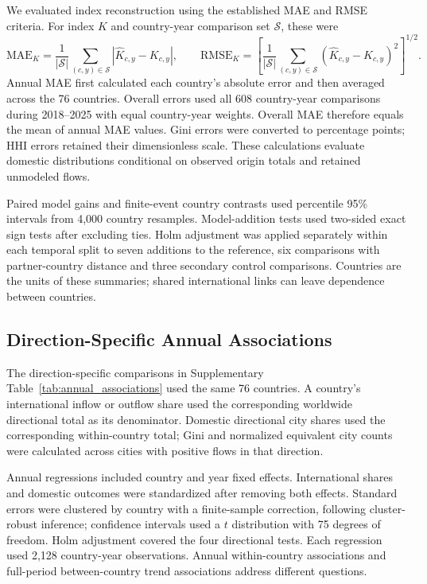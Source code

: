 We evaluated index reconstruction using the established MAE and RMSE criteria\cite{hodson2022}. For index $K$ and country-year comparison set $\mathcal{S}$, these were
\begin{equation*}
\mathrm{MAE}_K=\frac{1}{|\mathcal{S}|}\sum_{(c,y)\in\mathcal{S}}
|\widehat{K}_{c,y}-K_{c,y}|,\qquad
\mathrm{RMSE}_K=\left[\frac{1}{|\mathcal{S}|}\sum_{(c,y)\in\mathcal{S}}
(\widehat{K}_{c,y}-K_{c,y})^2\right]^{1/2}.
\end{equation*}
Annual MAE first calculated each country's absolute error and then averaged across the 76 countries. Overall errors used all 608 country-year comparisons during 2018--2025 with equal country-year weights. Overall MAE therefore equals the mean of annual MAE values. Gini errors were converted to percentage points; HHI errors retained their dimensionless scale. These calculations evaluate domestic distributions conditional on observed origin totals and retained unmodeled flows.

Paired model gains and finite-event country contrasts used percentile 95\% intervals from 4,000 country resamples. Model-addition tests used two-sided exact sign tests after excluding ties. Holm adjustment\cite{holm1979} was applied separately within each temporal split to seven additions to the reference, six comparisons with partner-country distance and three secondary control comparisons. Countries are the units of these summaries; shared international links can leave dependence between countries.

\subsection{Direction-Specific Annual Associations}
\label{supp:annual_associations}

The direction-specific comparisons in Supplementary Table~\ref{tab:annual_associations} used the same 76 countries. A country's international inflow or outflow share used the corresponding worldwide directional total as its denominator. Domestic directional city shares used the corresponding within-country total; Gini and normalized equivalent city counts were calculated across cities with positive flows in that direction.

Annual regressions included country and year fixed effects. International shares and domestic outcomes were standardized after removing both effects. Standard errors were clustered by country with a finite-sample correction, following cluster-robust inference\cite{cameron2015}; confidence intervals used a $t$ distribution with 75 degrees of freedom. Holm adjustment covered the four directional tests. Each regression used 2,128 country-year observations. Annual within-country associations and full-period between-country trend associations address different questions.

\endgroup
